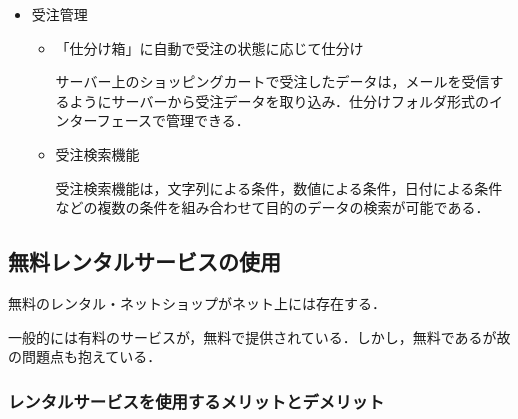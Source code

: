 \begin{itemize}
 \item	受注管理

\begin{itemize}
\setlength{\parskip}{3mm}

 \item	「仕分け箱」に自動で受注の状態に応じて仕分け

サーバー上のショッピングカートで受注したデータは，メールを受信するようにサーバーから受注データを取り込み．仕分けフォルダ形式のインターフェースで管理できる．

 \item	受注検索機能

受注検索機能は，文字列による条件，数値による条件，日付による条件などの複数の条件を組み合わせて目的のデータの検索が可能である．

\end{itemize}	

\end{itemize}


\subsection{無料レンタルサービスの使用}

無料のレンタル・ネットショップがネット上には存在する．

一般的には有料のサービスが，無料で提供されている．しかし，無料であるが故の問題点も抱えている．


\subsubsection{レンタルサービスを使用するメリットとデメリット}

